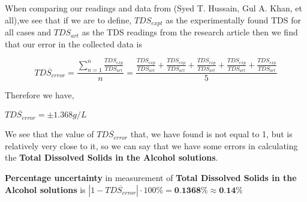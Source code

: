 {When comparing our readings and data from (Syed T. Hussain, Gul A. Khan, et all),we see that if we are to define, $TDS_{expt}$ as the experimentally found TDS for all cases and $TDS_{art}$ as the TDS readings from the research article then we find that our error in the collected data is} 

    $$\overline{TDS_{error}} = \frac{\sum_{n=1}^{n}{\frac{TDS_{exp}}{TDS_{art}}}}{n} = \frac{\frac{TDS_{exp}}{TDS_{art}} + \frac{TDS_{exp}}{TDS_{art}} + \frac{TDS_{exp}}{TDS_{art}} + \frac{TDS_{exp}}{TDS_{art}} + \frac{TDS_{exp}}{TDS_{art}}}{5}$$

{Therefore we have,}

    $\overline{TDS_{error}} = \pm 1.368 g/L$

{We see that the value of $\overline{TDS_{error}}$ that, we have found is not equal to 1, but is relatively very close to it, so we can say that we have some errors in calculating the \textbf{Total Dissolved Solids in the Alcohol solutions}.}
        
        {\textbf{Percentage uncertainty} in measurement of \textbf{Total Dissolved Solids in the Alcohol solutions} is $\left|1-\overline{TDS_{error}}\right|\cdot{100\%} = \textbf{0.1368\%} \approx \textbf{0.14\%}$}
        



